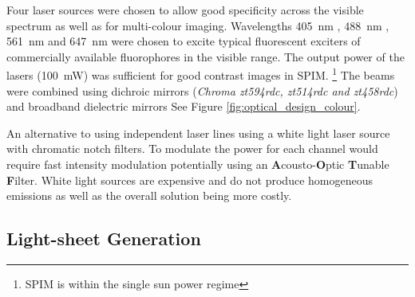 Four %
laser sources were chosen to allow good specificity across the visible spectrum as well  as for multi-colour imaging.
Wavelengths \textcolor{455nm}{\SI{405}{\nano\meter}} , \textcolor{488nm}{\SI{488}{\nano\meter}} , \textcolor{561nm}{\SI{561}{\nano\meter}} and \textcolor{647nm}{\SI{647}{\nano\meter}} were chosen to excite typical fluorescent exciters of commercially available fluorophores in the visible range.
The output power of the lasers (\SI{100}{\milli\watt}) was sufficient for good contrast images in SPIM.
\footnote{SPIM is within the single sun power regime} %
The beams were combined %
using dichroic mirrors %
(\emph{Chroma zt594rdc, zt514rdc and zt458rdc}) and broadband dielectric mirrors
See Figure \ref{fig:optical_design_colour}.

An alternative to using independent laser lines using a white light laser source with chromatic notch filters. %
To modulate the power for each channel would require fast intensity modulation potentially using an
\textbf{A}cousto-\textbf{O}ptic \textbf{T}unable \textbf{F}ilter.%
White light sources are expensive and do not produce homogeneous emissions as well as the overall solution being more costly.

\subsection{Light-sheet Generation}

